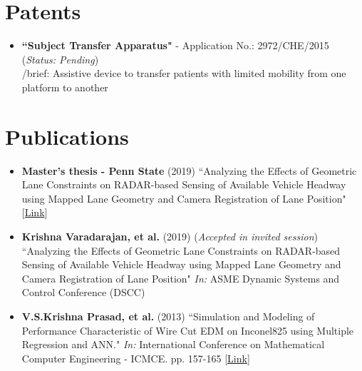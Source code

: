 \documentclass[letterpaper,10.5pt]{article}
\newcommand{\resumeSubHeadingListStart}{\begin{itemize}[leftmargin=*]}
\newcommand{\resumeSubHeadingListEnd}{\end{itemize}}
\begin{document}
%
\section{Patents}
 \resumeSubHeadingListStart
   \item{
    \textbf{``Subject Transfer Apparatus"} - Application No.: 2972/CHE/2015 (\textit{Status: Pending})\\
    /brief: Assistive device to transfer patients with limited mobility from one platform to another
   }
 \resumeSubHeadingListEnd

%
\section{Publications}
 \resumeSubHeadingListStart
   \item{
   \textbf{Master's thesis - Penn State} (2019) ``Analyzing the Effects of Geometric Lane Constraints on RADAR-based Sensing of Available Vehicle Headway using Mapped Lane Geometry and Camera Registration of Lane Position" [\href{https://etda.libraries.psu.edu/files/final_submissions/18697}{\color{blue}Link}]
   }
   \item{
   \textbf{Krishna Varadarajan, et al.} (2019) (\textit{Accepted in invited session}) ``Analyzing the Effects of Geometric Lane Constraints on RADAR-based Sensing of Available Vehicle Headway using Mapped Lane Geometry and Camera Registration of Lane Position" \textit{In:} ASME Dynamic Systems and Control Conference (DSCC)
   }
   \item{
    \textbf{V.S.Krishna Prasad, et al.} (2013) ``Simulation and Modeling of Performance Characteristic of Wire Cut EDM on Inconel825 using Multiple Regression and ANN." \textit{In:} International Conference on Mathematical Computer Engineering - ICMCE. pp. 157-165 [\href{http://www.conference.bonfring.org/papers/vit_icmce2013/icmce25.pdf}{\color{blue}Link}]
   }
 \resumeSubHeadingListEnd


%
\end{document}
